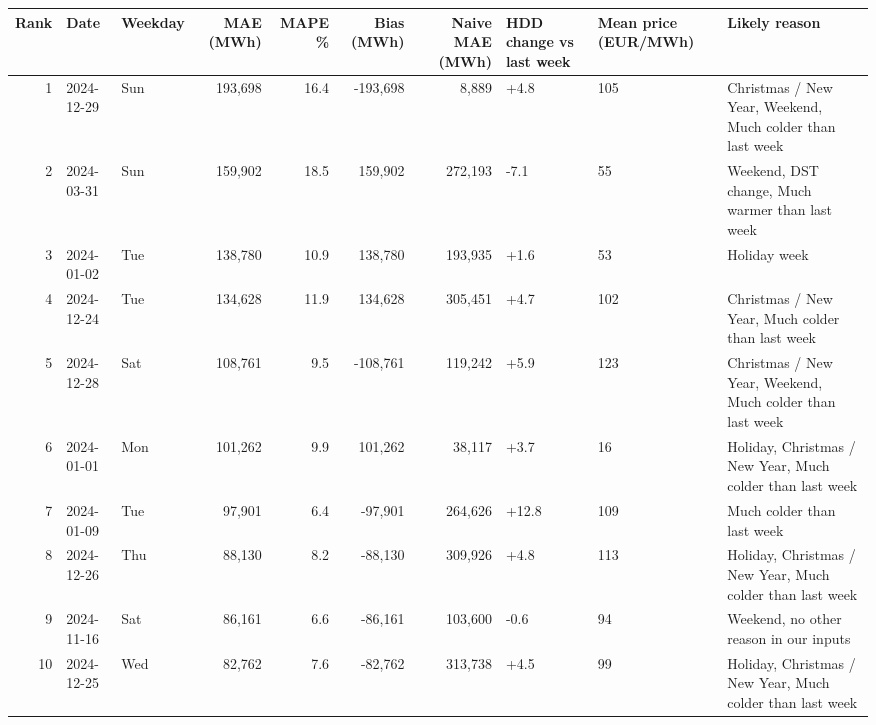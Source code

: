 \begin{tabular}{rllrrrrlll}
\toprule
Rank & Date & Weekday & MAE (MWh) & MAPE \% & Bias (MWh) & Naive MAE (MWh) & HDD change vs last week & Mean price (EUR/MWh) & Likely reason \\
\midrule
1 & 2024-12-29 & Sun & 193,698 & 16.4 & -193,698 & 8,889 & +4.8 & 105 & Christmas / New Year, Weekend, Much colder than last week \\
2 & 2024-03-31 & Sun & 159,902 & 18.5 & 159,902 & 272,193 & -7.1 & 55 & Weekend, DST change, Much warmer than last week \\
3 & 2024-01-02 & Tue & 138,780 & 10.9 & 138,780 & 193,935 & +1.6 & 53 & Holiday week \\
4 & 2024-12-24 & Tue & 134,628 & 11.9 & 134,628 & 305,451 & +4.7 & 102 & Christmas / New Year, Much colder than last week \\
5 & 2024-12-28 & Sat & 108,761 & 9.5 & -108,761 & 119,242 & +5.9 & 123 & Christmas / New Year, Weekend, Much colder than last week \\
6 & 2024-01-01 & Mon & 101,262 & 9.9 & 101,262 & 38,117 & +3.7 & 16 & Holiday, Christmas / New Year, Much colder than last week \\
7 & 2024-01-09 & Tue & 97,901 & 6.4 & -97,901 & 264,626 & +12.8 & 109 & Much colder than last week \\
8 & 2024-12-26 & Thu & 88,130 & 8.2 & -88,130 & 309,926 & +4.8 & 113 & Holiday, Christmas / New Year, Much colder than last week \\
9 & 2024-11-16 & Sat & 86,161 & 6.6 & -86,161 & 103,600 & -0.6 & 94 & Weekend, no other reason in our inputs \\
10 & 2024-12-25 & Wed & 82,762 & 7.6 & -82,762 & 313,738 & +4.5 & 99 & Holiday, Christmas / New Year, Much colder than last week \\
\bottomrule
\end{tabular}
